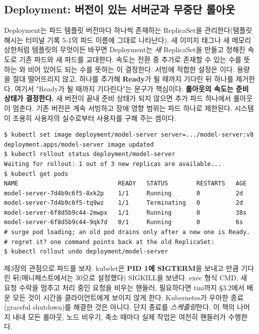 \subsection*{Deployment: 버전이 있는 서버군과 무중단 롤아웃}

Deployment는 파드 템플릿 버전마다 하나씩 존재하는 ReplicaSet을 관리한다(템플릿 해시는 터미널 기록 5-1의 파드 이름에 그대로 나타난다). 새 이미지 태그나 새 메모리 상한처럼 템플릿의 무엇이든 바꾸면 Deployment는 \textit{새} ReplicaSet을 만들고 정해진 속도로 기존 파드와 새 파드를 교대한다. 속도는 전환 중 추가로 존재할 수 있는 수를 뜻하는 와 비어 있어도 되는 수를 뜻하는 이 결정한다. 서빙에 적합한 설정은 이다. 용량을 절대 떨어뜨리지 않고, 하나를 추가해 \textbf{Ready}가 될 때까지 기다린 뒤 하나를 제거한다. 여기서 "Ready가 될 때까지 기다린다"는 문구가 핵심이다. \textbf{롤아웃의 속도는 준비 상태가 결정한다.} 새 버전이 끝내 준비 상태가 되지 않으면 추가 파드 하나에서 롤아웃이 멈춘다. 기존 버전은 계속 서빙하고 장애 영향 범위는 파드 하나로 제한된다. 시스템이 조용히 사용자의 실수로부터 사용자를 구해 주는 셈이다.

\begin{terminalbox}
\begin{Verbatim}[breaklines=true,breakanywhere=true,fontsize=\small,formatcom=\color{tbbtermfg},codes=\tbbcodeactive]
$ kubectl set image deployment/model-server server=.../model-server:v8
deployment.apps/model-server image updated
$ kubectl rollout status deployment/model-server
Waiting for rollout: 1 out of 3 new replicas are available...
$ kubectl get pods
NAME                            READY   STATUS        RESTARTS   AGE
model-server-7d4b9c6f5-8xk2p    1/1     Running       0          2d
model-server-7d4b9c6f5-tq9wz    1/1     Terminating   0          2d
model-server-6f8d5b9c44-2mwpx   1/1     Running       0          38s
model-server-6f8d5b9c44-9qk7d   0/1     Running       0          6s
# surge pod loading; an old pod drains only after a new one is Ready.
# regret it? one command points back at the old ReplicaSet:
$ kubectl rollout undo deployment/model-server
\end{Verbatim}
\end{terminalbox}

제3장의 관점으로  파드를 보자. kubelet은 \textbf{PID 1에 SIGTERM}을 보내고 만큼 기다린 뒤(매니페스트에서는 30으로 설정했다) SIGKILL을 보낸다. exec 형식 CMD, 새 요청 수락을 멈추고 처리 중인 요청을 비우는 핸들러, 필요하다면 tini까지 §3.2에서 배운 모든 것이  시간을 클라이언트에게 보이지 않게 한다. Kubernetes가 우아한 종료(graceful shutdown)를 해결한 것은 아니다. 단지 종료를 \textit{스케줄링}한다. 이 책의 나머지 내내 모든 롤아웃, 노드 비우기, 축소 때마다 실제 작업은 여전히 핸들러가 수행한다.

